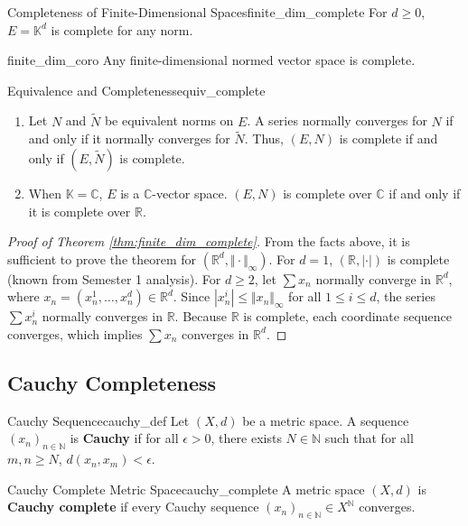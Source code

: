 \documentclass[11pt, a4paper]{article}
\newcommand{\R}{\mathbb{R}}
\newcommand{\N}{\mathbb{N}}
\newcommand{\C}{\mathbb{C}}
\begin{document}
\begin{theorem}{Completeness of Finite-Dimensional Spaces}{finite_dim_complete}
For $d \ge 0$, $E = \mathbb{K}^d$ is complete for any norm.
\end{theorem}
\begin{corollary}{}{finite_dim_coro}
Any finite-dimensional normed vector space is complete.
\end{corollary}
\begin{lemma}{Equivalence and Completeness}{equiv_complete}
\begin{enumerate}
    \item Let $N$ and $\tilde{N}$ be equivalent norms on $E$. A series normally converges for $N$ if and only if it normally converges for $\tilde{N}$. Thus, $(E, N)$ is complete if and only if $(E, \tilde{N})$ is complete.
    \item When $\mathbb{K} = \C$, $E$ is a $\C$-vector space. $(E, N)$ is complete over $\C$ if and only if it is complete over $\R$.
\end{enumerate}
\end{lemma}
\begin{proof}[Proof of Theorem \ref{thm:finite_dim_complete}]
From the facts above, it is sufficient to prove the theorem for $(\R^d, \Vert \cdot \Vert_\infty)$.
For $d = 1$, $(\R, |\cdot|)$ is complete (known from Semester 1 analysis).
For $d \ge 2$, let $\sum x_n$ normally converge in $\R^d$, where $x_n = (x_n^1, \dots, x_n^d) \in \R^d$.
Since $|x_n^i| \le \Vert x_n \Vert_\infty$ for all $1 \le i \le d$, the series $\sum x_n^i$ normally converges in $\R$.
Because $\R$ is complete, each coordinate sequence converges, which implies $\sum x_n$ converges in $\R^d$.
\end{proof}

\subsection{Cauchy Completeness}
\begin{definition}{Cauchy Sequence}{cauchy_def}
Let $(X, d)$ be a metric space. A sequence $(x_n)_{n \in \N}$ is \textbf{Cauchy} if for all $\epsilon > 0$, there exists $N \in \N$ such that for all $m, n \ge N$, $d(x_n, x_m) < \epsilon$.
\end{definition}

\begin{definition}{Cauchy Complete Metric Space}{cauchy_complete}
A metric space $(X, d)$ is \textbf{Cauchy complete} if every Cauchy sequence $(x_n)_{n \in \N} \in X^\N$ converges.
\end{definition}
\end{document}
